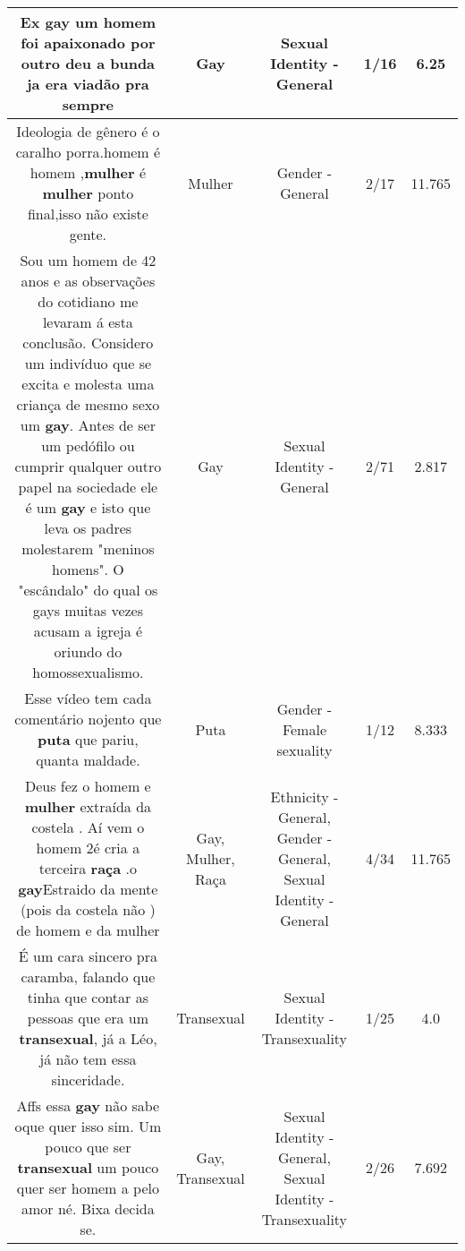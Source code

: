 \documentclass[11pt]{article}
\newlength\mylength
\begin{document}
\begin{center}
\begin{longtable}{|C{.65\mylength}|C{.30\mylength}|C{.12\mylength}|C{.12\mylength}|C{.12\mylength}|}
  \small Ex \textbf{gay} um homem foi apaixonado por outro deu a bunda ja era viadão pra sempre\normalsize   & Gay & Sexual Identity - General & 1/16 & 6.25 \\  \hline
  \small Ideologia de gênero é o caralho porra.homem é homem ,\textbf{mulher} é \textbf{mulher} ponto final,isso não existe gente.\normalsize   & Mulher & Gender - General & 2/17 & 11.765 \\  \hline
  \small Sou um homem de 42 anos e as observações do cotidiano me levaram á esta conclusão.  Considero um indivíduo que se excita e molesta uma criança de mesmo sexo um \textbf{gay}. Antes de ser um pedófilo ou cumprir qualquer outro papel na sociedade ele é um \textbf{gay} e isto que leva os padres molestarem "meninos homens".   O "escândalo" do qual os gays muitas vezes acusam a igreja é oriundo do homossexualismo.\normalsize   & Gay & Sexual Identity - General & 2/71 & 2.817 \\  \hline
  \small Esse vídeo tem cada comentário nojento que \textbf{puta} que pariu, quanta maldade.\normalsize   & Puta & Gender - Female sexuality & 1/12 & 8.333 \\  \hline
  \small Deus fez o homem e \textbf{mulher} extraída da costela . Aí vem o homem 2é cria a terceira \textbf{raça} .o \textbf{gay}Estraido da mente (pois da costela não ) de homem e da mulher\normalsize   & Gay, Mulher, Raça & Ethnicity - General, Gender - General, Sexual Identity - General & 4/34 & 11.765 \\  \hline
  \small É um cara sincero pra caramba, falando que tinha que contar as pessoas que era um \textbf{transexual}, já a Léo, já não tem essa sinceridade.\normalsize   & Transexual & Sexual Identity - Transexuality & 1/25 & 4.0 \\  \hline
  \small Affs essa \textbf{gay} não sabe oque quer isso sim. Um pouco que ser \textbf{transexual} um pouco quer ser homem a pelo amor né. Bixa decida se.\normalsize   & Gay, Transexual & Sexual Identity - General, Sexual Identity - Transexuality & 2/26 & 7.692 \\  \hline

\end{longtable}
\end{center}
\end{document}
